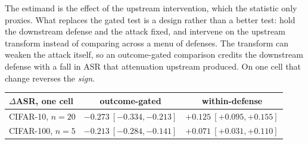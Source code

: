 \documentclass{article}
\begin{document}
\noindent The estimand is the effect of the upstream intervention, which the statistic only proxies. What replaces the gated test is a design rather than a better test: hold the downstream defense and the attack fixed, and intervene on the upstream transform instead of comparing across a menu of defenses. The transform can weaken the attack itself, so an outcome-gated comparison credits the downstream defense with a fall in ASR that attenuation upstream produced. On one cell that change reverses the \emph{sign}.
\begin{center}\small\vspace{-3pt}
\begin{tabular}{@{}l@{\quad}c@{\quad}c@{}}
\toprule
$\Delta$ASR, one cell & outcome-gated & within-defense \\
\midrule
CIFAR-10, $n{=}20$ & $-0.273\ [-0.334,-0.213]$ & $+0.125\ [+0.095,+0.155]$ \\
CIFAR-100, $n{=}5$ & $-0.213\ [-0.284,-0.141]$ & $+0.071\ [+0.031,+0.110]$ \\
\bottomrule
\end{tabular}\vspace{-3pt}
\end{center}
\end{document}
